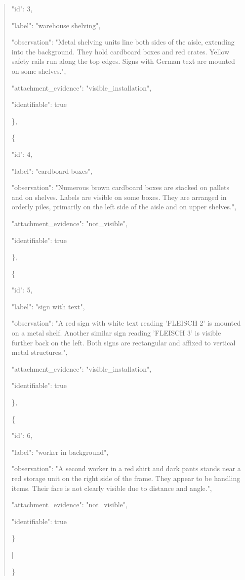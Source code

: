 \documentclass[10pt,a4paper]{article}
\begin{document}
\begin{quote}
      "id":\allowbreak{} 3,\allowbreak{}\par
      "label":\allowbreak{} "warehouse shelving",\allowbreak{}\par
      "observation":\allowbreak{} "Metal shelving units line both sides of the aisle,\allowbreak{} extending into the background. They hold cardboard boxes and red crates. Yellow safety rails run along the top edges. Signs with German text are mounted on some shelves.",\allowbreak{}\par
      "attachment\_evidence":\allowbreak{} "visible\_installation",\allowbreak{}\par
      "identifiable":\allowbreak{} true\par
    \},\allowbreak{}\par
    \{\par
      "id":\allowbreak{} 4,\allowbreak{}\par
      "label":\allowbreak{} "cardboard boxes",\allowbreak{}\par
      "observation":\allowbreak{} "Numerous brown cardboard boxes are stacked on pallets and on shelves. Labels are visible on some boxes. They are arranged in orderly piles,\allowbreak{} primarily on the left side of the aisle and on upper shelves.",\allowbreak{}\par
      "attachment\_evidence":\allowbreak{} "not\_visible",\allowbreak{}\par
      "identifiable":\allowbreak{} true\par
    \},\allowbreak{}\par
    \{\par
      "id":\allowbreak{} 5,\allowbreak{}\par
      "label":\allowbreak{} "sign with text",\allowbreak{}\par
      "observation":\allowbreak{} "A red sign with white text reading 'FLEISCH 2' is mounted on a metal shelf. Another similar sign reading 'FLEISCH 3' is visible further back on the left. Both signs are rectangular and affixed to vertical metal structures.",\allowbreak{}\par
      "attachment\_evidence":\allowbreak{} "visible\_installation",\allowbreak{}\par
      "identifiable":\allowbreak{} true\par
    \},\allowbreak{}\par
    \{\par
      "id":\allowbreak{} 6,\allowbreak{}\par
      "label":\allowbreak{} "worker in background",\allowbreak{}\par
      "observation":\allowbreak{} "A second worker in a red shirt and dark pants stands near a red storage unit on the right side of the frame. They appear to be handling items. Their face is not clearly visible due to distance and angle.",\allowbreak{}\par
      "attachment\_evidence":\allowbreak{} "not\_visible",\allowbreak{}\par
      "identifiable":\allowbreak{} true\par
    \}\par
  ]\par
\}
\end{quote}
\end{document}
